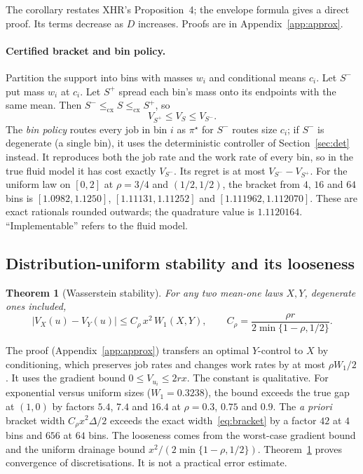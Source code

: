\documentclass[11pt]{article}
\numberwithin{equation}{section}
\newtheorem{theorem}{Theorem}
\theoremstyle{definition}
\theoremstyle{remark}
\newcommand{\cx}{\le_{\mathrm{cx}}}
\begin{document}
The corollary restates XHR's Proposition~4; the envelope formula gives a direct proof. Its terms decrease as $D$ increases. Proofs are in Appendix~\ref{app:approx}.

\paragraph{Certified bracket and bin policy.} Partition the support into bins with masses $w_i$ and conditional means $c_i$. Let $S^-$ put mass $w_i$ at $c_i$. Let $S^+$ spread each bin's mass onto its endpoints with the same mean. Then $S^-\cx S\cx S^+$, so
\begin{equation}\label{eq:bracket}
V_{S^+}\le V_S\le V_{S^-}.
\end{equation}
The \emph{bin policy} routes every job in bin $i$ as $\pi^\star$ for $S^-$ routes size $c_i$; if $S^-$ is degenerate (a single bin), it uses the deterministic controller of Section~\ref{sec:det} instead. It reproduces both the job rate and the work rate of every bin, so in the true fluid model it has cost exactly $V_{S^-}$. Its regret is at most $V_{S^-}-V_{S^+}$. For the uniform law on $[0,2]$ at $\rho=3/4$ and $(1/2,1/2)$, the bracket from $4$, $16$ and $64$ bins is $[1.0982,1.1250]$, $[1.11131,1.11252]$ and $[1.111962,1.112070]$. These are exact rationals rounded outwards; the quadrature value is $1.1120164$. ``Implementable'' refers to the fluid model.

\subsection{Distribution-uniform stability and its looseness}

\begin{theorem}[Wasserstein stability]\label{thm:wass}
For any two mean-one laws $X,Y$, degenerate ones included,
\begin{equation}\label{eq:wass}
|V_X(u)-V_Y(u)|\le C_\rho\,x^2\,W_1(X,Y),\qquad C_\rho=\frac{\rho r}{2\min\{1-\rho,1/2\}}.
\end{equation}
\end{theorem}

The proof (Appendix~\ref{app:approx}) transfers an optimal $Y$-control to $X$ by conditioning, which preserves job rates and changes work rates by at most $\rho W_1/2$. It uses the gradient bound $0\le V_{u_i}\le2rx$. The constant is qualitative. For exponential versus uniform sizes ($W_1=0.3238$), the bound exceeds the true gap at $(1,0)$ by factors $5.4$, $7.4$ and $16.4$ at $\rho=0.3$, $0.75$ and $0.9$. The \emph{a priori} bracket width $C_\rho x^2\Delta/2$ exceeds the exact width~\eqref{eq:bracket} by a factor $42$ at $4$ bins and $656$ at $64$ bins. The looseness comes from the worst-case gradient bound and the uniform drainage bound $x^2/(2\min\{1-\rho,1/2\})$. Theorem~\ref{thm:wass} proves convergence of discretisations. It is not a practical error estimate.
\end{document}
